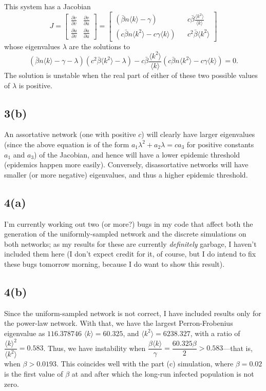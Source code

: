 \documentclass[]{article}
\begin{document}
	This system has a Jacobian
	\[
	J = \begin{bmatrix} \frac{\partial\dot{v}}{\partial v} &\frac{\partial\dot{v}}{\partial u} \\
	\frac{\partial\dot{u}}{\partial v} & \frac{\partial\dot{u}}{\partial u}
	\end{bmatrix} = \begin{bmatrix} (\bar{\beta} n \langle k \rangle - \gamma) && c \bar{\beta}
	\frac{ \langle k^2 \rangle }{ \langle k \rangle} \\
	(c\bar{\beta} n \langle k^2 \rangle - c\gamma \langle k \rangle) && c^2\bar{\beta}\langle k^2 \rangle \end{bmatrix}
	\]
	whose eigenvalues $\lambda$ are the solutions to
	\[
	(\bar{\beta} n \langle k \rangle - \gamma - \lambda)(c^2\bar{\beta}\langle k^2 \rangle - \lambda) - c \bar{\beta}
	\frac{ \langle k^2 \rangle }{ \langle k \rangle}(c\bar{\beta} n \langle k^2 \rangle - c\gamma \langle k \rangle) = 0.
	\]
	The solution is unstable when the real part of either of these two possible values of $\lambda$ is positive.
	\subsection*{3(b)} An assortative network (one with positive $c$) will clearly have larger eigenvalues (since the above equation is of the form $a_1 \lambda^2 + a_2 \lambda = c a_3$ for positive constants $a_1$ and $a_3$) of the Jacobian, and hence will have a lower epidemic threshold (epidemics happen more easily). Conversely, disassortative networks will have smaller (or more negative) eigenvalues, and thus a higher epidemic threshold.
	
	\subsection*{4(a)} I'm currently working out two (or more?) bugs in my code that affect both the generation of the uniformly-sampled network and the discrete simulations on both networks; as my results for these are currently \textit{definitely} garbage, I haven't included them here (I don't expect credit for it, of course, but I do intend to fix these bugs tomorrow morning, because I do want to show this result). 
	\subsection*{4(b)} Since the uniform-sampled network is not correct, I have included results only for the power-law network. With that, we have the largest Perron-Frobenius eigenvalue as $116.378746$ $\langle k \rangle = 60.325$, and $\langle k^2 \rangle = 6238.327$, with a ratio of $\dfrac{\langle k \rangle^2}{\langle k^2 \rangle} = 0.583$. Thus, we have instability when $\dfrac{\beta \langle k \rangle}{\gamma} = \dfrac{60.325 \beta}{2} > 0.583$---that is, when $\beta > 0.0193$. This coincides well with the part (c) simulation, where $\beta = 0.02$ is the first value of $\beta$ at and after which the long-run infected population is not zero.
\end{document}
